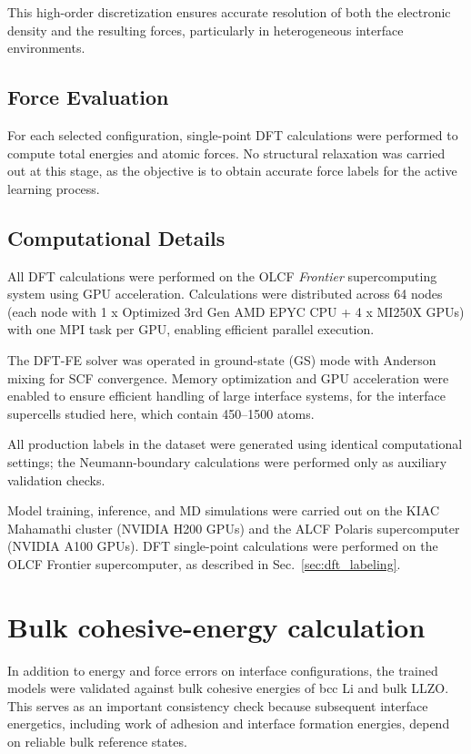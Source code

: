 \documentclass[12pt,a4paper,oneside]{book}
\newcommand{\secref}[1]{Sec.~\ref{#1}}
\begin{document}
This high-order discretization ensures accurate resolution of both the electronic density and the resulting forces, particularly in heterogeneous interface environments.

\subsection{Force Evaluation}

For each selected configuration, single-point DFT calculations were performed to compute total energies and atomic forces. No structural relaxation was carried out at this stage, as the objective is to obtain accurate force labels for the active learning process.

\subsection{Computational Details}

All DFT calculations were performed on the OLCF \textit{Frontier} supercomputing system using GPU acceleration. Calculations were distributed across 64 nodes (each node with 1 x Optimized 3rd Gen AMD EPYC CPU + 4 x MI250X GPUs) with one MPI task per GPU, enabling efficient parallel execution.

The DFT-FE solver was operated in ground-state (GS) mode with Anderson mixing for SCF convergence. Memory optimization and GPU acceleration were enabled to ensure efficient handling of large interface systems, for the interface supercells studied here, which contain 450--1500 atoms.

All production labels in the dataset were generated using identical computational settings; the Neumann-boundary calculations were performed only as auxiliary validation checks.

Model training, inference, and MD simulations were carried out on the KIAC 
Mahamathi cluster (NVIDIA H200 GPUs) and the ALCF Polaris supercomputer 
(NVIDIA A100 GPUs). DFT single-point calculations were performed on the 
OLCF Frontier supercomputer, as described in \secref{sec:dft_labeling}.


\section{Bulk cohesive-energy calculation}

In addition to energy and force errors on interface configurations, the trained models were validated against bulk cohesive energies of bcc Li and bulk LLZO. This serves as an important consistency check because subsequent interface energetics, including work of adhesion and interface formation energies, depend on reliable bulk reference states.
\end{document}
